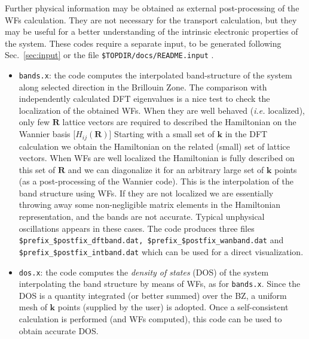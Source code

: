 \noindent
Further physical information may be obtained as external
post-processing of the WFs calculation. They are not necessary for
the transport calculation, but they may be useful for a
better understanding of the intrinsic electronic properties of the
system. These codes require a separate input, to be generated
following Sec.~\ref{sec:input} or the file
{\tt \$TOPDIR/docs/README.input} .

%
%
\begin{itemize}
%
\item {\tt bands.x}: the code computes the interpolated band-structure
      of the system along selected direction in the Brillouin Zone.
      The comparison with independently calculated DFT eigenvalues is
      a nice test to check the localization of the obtained WFs.
      When they are well behaved ({\it i.e.} localized), only few $\mathbf{R}$ lattice
      vectors are required to described the Hamiltonian on the Wannier basis
      [$H_{ij}(\mathbf{R})$]
      Starting with a small set of $\mathbf{k}$ in the DFT calculation
      we obtain the Hamiltonian on the related (small) set of lattice vectors.
      When WFs are well localized
      the Hamiltonian is fully described on this set of $\mathbf{R}$ and we can
      diagonalize it for an arbitrary large set of $\mathbf{k}$ points
      (as a post-processing of the Wannier code). This is the
      interpolation of the band structure using WFs. If they are not localized
      we are essentially throwing away some non-negligible matrix elements
      in the Hamiltonian representation, and the bands
      are not accurate. Typical unphysical oscillations appears in these cases.
      The code produces three files {\tt \$prefix\_\$postfix\_dftband.dat,
      \$prefix\_\$postfix\_wanband.dat} and {\tt \$prefix\_\$postfix\_intband.dat}
      which can be used for a direct visualization.

\item {\tt dos.x}: the code computes the {\it density of states} (DOS) 
      of the system interpolating the band structure by means of WFs, as
      for {\tt bands.x}. Since the DOS is a quantity integrated (or better summed)
      over the BZ, a uniform mesh of $\mathbf{k}$ points (supplied by the user)
      is adopted.
      Once a self-consistent calculation is performed (and WFs computed), this code can be 
      used to obtain accurate DOS. 


\end{itemize}
